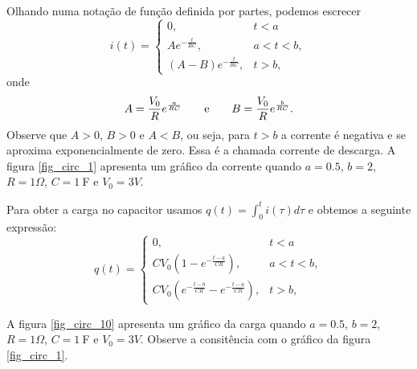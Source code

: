 Olhando numa notação de função definida por partes, podemos escrecer
\begin{equation}
i(t)=\left\{\begin{array}{ll}0,&t<a  \\A e^{-\frac{t}{RC}}, &a<t<b, \\ \left(A-B\right)e^{-\frac{t}{RC}}, &t>b, \end{array}\right.
\end{equation}
onde
\begin{equation}
A=\frac{V_0}{R}e^{\frac{a}{RC}}\qquad\hbox{e}\qquad B=\frac{V_0}{R}e^{\frac{b}{RC}}.
\end{equation}
Observe que $A>0$, $B>0$ e $A<B$, ou seja, para $t>b$ a corrente é negativa e se aproxima exponencialmente de zero. Essa é a chamada corrente de descarga. A figura \ref{fig_circ_1} apresenta um gráfico da corrente quando $a=0.5$, $b=2$, $R=1\Omega$, $C=1\ \!$F e $V_0=3V$.

Para obter a carga no capacitor usamos $q(t)=\int_0^t i(\tau)d\tau$ e obtemos a seguinte expressão:
\begin{equation}\label{eq:sol_carga}
q(t)=\left\{\begin{array}{ll}0,&t<a  \\ CV_0\left(1-e^{-\frac{t-a}{CR}}\right), &a<t<b, \\ CV_0\left(e^{-\frac{t-b}{CR}}-e^{-\frac{t-a}{CR}} \right), &t>b, \end{array}\right.
\end{equation}

A figura \ref{fig_circ_10} apresenta um gráfico da carga quando $a=0.5$, $b=2$, $R=1\Omega$, $C=1\ \!$F e $V_0=3V$. Observe a consitência com o gráfico da figura \ref{fig_circ_1}.


